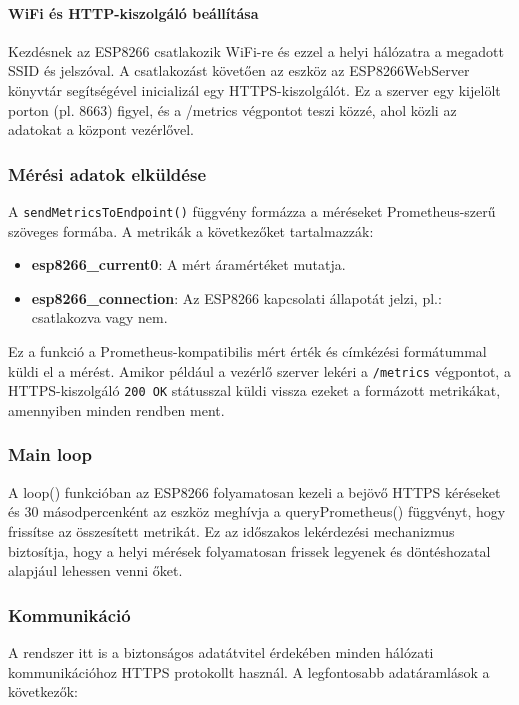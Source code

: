 \paragraph{WiFi és HTTP-kiszolgáló beállítása}
Kezdésnek az ESP8266 csatlakozik WiFi-re és ezzel a helyi hálózatra a megadott SSID és jelszóval. 
A csatlakozást követően az eszköz az ESP8266WebServer könyvtár segítségével inicializál egy HTTPS-kiszolgálót. 
Ez a szerver egy kijelölt porton (pl. 8663) figyel, és a /metrics végpontot teszi közzé, 
ahol közli az adatokat a központ vezérlővel.

\subsubsection{Mérési adatok elküldése}

A \texttt{sendMetricsToEndpoint()} függvény formázza a méréseket Prometheus-szerű szöveges formába. A metrikák a következőket tartalmazzák:

\begin{itemize}
  \item \textbf{esp8266\_current0}: A mért áramértéket mutatja.
  \item \textbf{esp8266\_connection}: Az ESP8266 kapcsolati állapotát jelzi, pl.: csatlakozva vagy nem.
\end{itemize}

Ez a funkció a Prometheus-kompatibilis mért érték és címkézési formátummal küldi el a mérést. 
Amikor például a vezérlő szerver lekéri a \texttt{/metrics} végpontot, a HTTPS-kiszolgáló 
\texttt{200 OK} státusszal küldi vissza ezeket a formázott metrikákat, amennyiben minden rendben ment.

\subsubsection{Main loop}
A loop() funkcióban az ESP8266 folyamatosan kezeli a bejövő HTTPS kéréseket és 30 másodpercenként 
az eszköz meghívja a queryPrometheus() függvényt, hogy frissítse az összesített metrikát. 
Ez az időszakos lekérdezési mechanizmus biztosítja, hogy a helyi mérések folyamatosan frissek 
legyenek és döntéshozatal alapjául lehessen venni őket.

\subsubsection{Kommunikáció}
A rendszer itt is a biztonságos adatátvitel érdekében minden hálózati kommunikációhoz HTTPS protokollt használ. 
A legfontosabb adatáramlások a következők:

